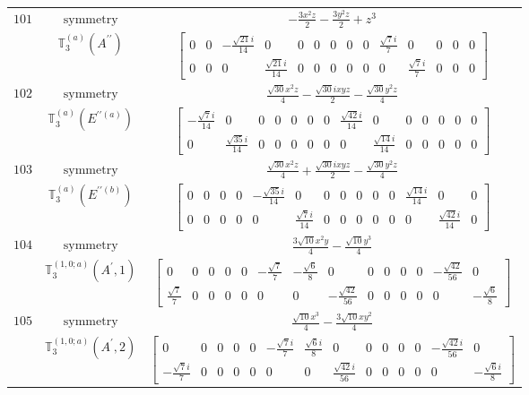 \documentclass[fleqn,8pt,landscape]{jsarticle}
\begin{document}
\begin{longtable}{ccc}
$ 101 $ & $ \text{symmetry} $ & $ - \frac{3 x^{2} z}{2} - \frac{3 y^{2} z}{2} + z^{3} $ \\
$  $ & $ \mathbb{T}_{3}^{(a)}(A^{\prime\prime}) $ & $ \begin{bmatrix} 0 & 0 & - \frac{\sqrt{21} i}{14} & 0 & 0 & 0 & 0 & 0 & 0 & \frac{\sqrt{7} i}{7} & 0 & 0 & 0 & 0 \\ 0 & 0 & 0 & \frac{\sqrt{21} i}{14} & 0 & 0 & 0 & 0 & 0 & 0 & \frac{\sqrt{7} i}{7} & 0 & 0 & 0 \end{bmatrix} $ \\ \hline
$ 102 $ & $ \text{symmetry} $ & $ \frac{\sqrt{30} x^{2} z}{4} - \frac{\sqrt{30} i x y z}{2} - \frac{\sqrt{30} y^{2} z}{4} $ \\
$  $ & $ \mathbb{T}_{3}^{(a)}(E^{\prime\prime(a)}) $ & $ \begin{bmatrix} - \frac{\sqrt{7} i}{14} & 0 & 0 & 0 & 0 & 0 & 0 & \frac{\sqrt{42} i}{14} & 0 & 0 & 0 & 0 & 0 & 0 \\ 0 & \frac{\sqrt{35} i}{14} & 0 & 0 & 0 & 0 & 0 & 0 & \frac{\sqrt{14} i}{14} & 0 & 0 & 0 & 0 & 0 \end{bmatrix} $ \\ \hline
$ 103 $ & $ \text{symmetry} $ & $ \frac{\sqrt{30} x^{2} z}{4} + \frac{\sqrt{30} i x y z}{2} - \frac{\sqrt{30} y^{2} z}{4} $ \\
$  $ & $ \mathbb{T}_{3}^{(a)}(E^{\prime\prime(b)}) $ & $ \begin{bmatrix} 0 & 0 & 0 & 0 & - \frac{\sqrt{35} i}{14} & 0 & 0 & 0 & 0 & 0 & 0 & \frac{\sqrt{14} i}{14} & 0 & 0 \\ 0 & 0 & 0 & 0 & 0 & \frac{\sqrt{7} i}{14} & 0 & 0 & 0 & 0 & 0 & 0 & \frac{\sqrt{42} i}{14} & 0 \end{bmatrix} $ \\ \hline
$ 104 $ & $ \text{symmetry} $ & $ \frac{3 \sqrt{10} x^{2} y}{4} - \frac{\sqrt{10} y^{3}}{4} $ \\
$  $ & $ \mathbb{T}_{3}^{(1,0;a)}(A^{\prime},1) $ & $ \begin{bmatrix} 0 & 0 & 0 & 0 & 0 & - \frac{\sqrt{7}}{7} & - \frac{\sqrt{6}}{8} & 0 & 0 & 0 & 0 & 0 & - \frac{\sqrt{42}}{56} & 0 \\ \frac{\sqrt{7}}{7} & 0 & 0 & 0 & 0 & 0 & 0 & - \frac{\sqrt{42}}{56} & 0 & 0 & 0 & 0 & 0 & - \frac{\sqrt{6}}{8} \end{bmatrix} $ \\ \hline
$ 105 $ & $ \text{symmetry} $ & $ \frac{\sqrt{10} x^{3}}{4} - \frac{3 \sqrt{10} x y^{2}}{4} $ \\
$  $ & $ \mathbb{T}_{3}^{(1,0;a)}(A^{\prime},2) $ & $ \begin{bmatrix} 0 & 0 & 0 & 0 & 0 & - \frac{\sqrt{7} i}{7} & \frac{\sqrt{6} i}{8} & 0 & 0 & 0 & 0 & 0 & - \frac{\sqrt{42} i}{56} & 0 \\ - \frac{\sqrt{7} i}{7} & 0 & 0 & 0 & 0 & 0 & 0 & \frac{\sqrt{42} i}{56} & 0 & 0 & 0 & 0 & 0 & - \frac{\sqrt{6} i}{8} \end{bmatrix} $ \\ \hline

\end{longtable}
\end{document}
